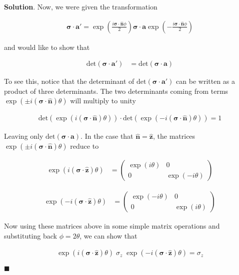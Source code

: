\documentclass[12pt]{article}
\theoremstyle{definition}
\newenvironment{s}{%
        \begin{trivlist} \item \textbf{Solution}. }{%
            \hspace*{\fill} $\blacksquare$\end{trivlist}}%
\begin{document}
{\begin{s}
Now, we were given the transformation

\begin{align*}
\bm{\sigma}\cdot \bm{a}' = \exp\left(\frac{i\bm{\sigma}\cdot\bm{\hat{n}}\phi}{2}\right)\bm{\sigma}\cdot \bm{a} \exp\left(-\frac{i\bm{\sigma}\cdot\bm{\hat{n}}\phi}{2}\right)
\end{align*}

and would like to show that

\begin{align*}
\mathrm{det}(\bm{\sigma}\cdot \bm{a}' ) &= \mathrm{det}(\bm{\sigma}\cdot \bm{a} )
\end{align*}

To see this, notice that the determinant of $\mathrm{det}(\bm{\sigma}\cdot \bm{a}')$ can be written as a product of three determinants. The two determinants coming from terms $\exp(\pm i(\bm{\sigma}\cdot\bm{\hat{n}})\theta)$ will multiply to unity 

\begin{align*}
\mathrm{det}(\exp(i(\bm{\sigma}\cdot\bm{\hat{n}})\theta)) \cdot \mathrm{det}(\exp(- i(\bm{\sigma}\cdot\bm{\hat{n}})\theta)) = 1
\end{align*}

Leaving only $\mathrm{det}(\bm{\sigma}\cdot \bm{a} )$. In the case that $\mathbf{\hat{n}} = \mathbf{\hat{z}}$, the matrices $\exp(\pm i(\bm{\sigma}\cdot\bm{\hat{n}})\theta)$  reduce to 

\begin{align*}
\exp(i(\bm{\sigma}\cdot\bm{\hat{z}})\theta) &=
\begin{pmatrix}
\exp(i\theta) & 0\\
0 & \exp(-i\theta)
\end{pmatrix}
\end{align*}

\begin{align*}
\exp(-i(\bm{\sigma}\cdot\bm{\hat{z}})\theta) &=
\begin{pmatrix}
\exp(-i\theta) & 0\\
0 & \exp(i\theta)
\end{pmatrix}
\end{align*}

Now using these matrices above in some simple matrix operations and substituting back $\phi = 2\theta$, we can show that

\begin{align*}
\exp(i(\bm{\sigma}\cdot\bm{\hat{z}})\theta) \; \sigma_{z}\;\exp(-i(\bm{\sigma}\cdot\bm{\hat{z}})\theta) = \sigma_{z}
\end{align*}


\end{s}}
\end{document}
